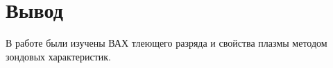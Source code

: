 \section{Вывод}
В работе были изучены ВАХ тлеющего разряда и свойства плазмы методом зондовых характеристик.
